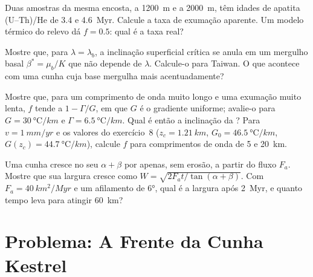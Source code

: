 \begin{exercise}[$\star\star$]\label{exo:b3:orogenic-wedges:9}
Duas amostras da mesma encosta, a \qty{1200}{m} e a \qty{2000}{m}, têm idades de apatita
(U--Th)/He de 3.4 e \qty{4.6}{Myr}. Calcule a taxa de exumação
aparente. Um modelo térmico do relevo dá $f = 0.5$: qual é a taxa real?
\end{exercise}

\begin{exercise}[$\star\star\star$]\label{exo:b3:orogenic-wedges:10}
Mostre que, para $\lambda = \lambda_b$, a inclinação superficial crítica se anula em um
mergulho basal $\beta^* = \mu_b/K$ que não depende de $\lambda$. Calcule-o para
Taiwan. O que acontece com uma cunha cuja base mergulha mais acentuadamente?
\end{exercise}

\begin{exercise}[$\star\star\star$]\label{exo:b3:orogenic-wedges:11}
Mostre que, para um comprimento de onda muito longo e uma exumação muito lenta, $f$ tende a
$1 - \Gamma/G$, em que $G$ é o gradiente uniforme; avalie-o para $G =
\qty{30}{\celsius/km}$ e $\Gamma = \qty{6.5}{\celsius/km}$. Qual é então a
inclinação da ? Para $v = \qty{1}{mm/yr}$ e os
valores do exercício~8 ($z_c = \qty{1.21}{km}$, $G_0 = \qty{46.5}{\celsius/km}$,
$G(z_c) = \qty{44.7}{\celsius/km}$), calcule $f$ para comprimentos de onda de 5 e
\qty{20}{km}.
\end{exercise}

\begin{exercise}[$\star\star\star$]\label{exo:b3:orogenic-wedges:12}
Uma cunha cresce no seu  $\alpha + \beta$ por 
apenas, sem erosão, a partir do fluxo $F_a$. Mostre que sua largura cresce como
$W = \sqrt{2F_at/\tan(\alpha + \beta)}$. Com $F_a = \qty{40}{km^2/Myr}$ e
um afilamento de \ang{6}, qual é a largura após \qty{2}{Myr}, e quanto tempo
leva para atingir \qty{60}{km}?
\end{exercise}

\section{Problema: A Frente da Cunha Kestrel}

